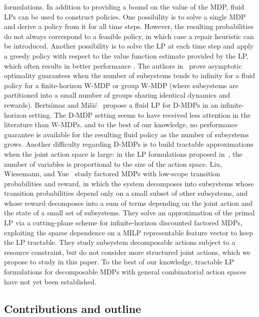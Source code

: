 \documentclass{article}
\begin{document}
formulations. In addition to providing a bound on the value of the MDP, fluid LPs can be used to construct policies. One possibility is to solve a single MDP and derive a policy from it for all time steps. However, the resulting probabilities do not always correspond to a feasible policy, in which case a repair heuristic \cite{DAeth2023HospitalScheduling} can be introduced. Another possibility is to solve the LP at each time step and apply a greedy policy with respect to the value function estimate provided by the LP, which often results in better performance \cite{gast2022lpupdate}. The authors in~\cite{brownzhang2022, DAeth2023HospitalScheduling} prove asymptotic optimality
guarantees when the number of subsystems tends to infinity for a fluid policy for a finite-horizon W-MDP or group W-MDP (where subsystems are partitioned into a small number of groups sharing identical dynamics and rewards). Bertsimas and Mišić~\cite{bertsimas2016}
propose a fluid LP for D-MDPs in an infinite-horizon setting. The D-MDP setting seems to have received
less attention in the literature than W-MDPs, and to the best of our knowledge, no
performance guarantee is available for the resulting fluid policy as the number of subsystems grows. Another difficulty regarding D-MDPs is to build tractable approximations when the joint action space is large: in the LP formulations proposed in~\cite{bertsimas2016}, the number of variables is proportional to the size of the action space. Liu,
Wiesemann, and Yue~\cite{liuwiesemannyue2024} study factored MDPs with low-scope transition
probabilities and reward, in which the system decomposes into subsystems whose transition probabilities
depend only on a small subset of other subsystems, and whose reward decomposes into a sum of terms
depending on the joint action and the state of a small set of subsystems. They solve an approximation of the primal LP via a cutting-plane scheme for infinite-horizon
discounted factored MDPs, exploiting the
sparse dependence on a MILP representable feature vector to keep the
LP tractable. They study subsystem decomposable actions subject to a resource constraint, but do not
consider more structured joint actions, which we propose to study in this paper. To the best of our
knowledge, tractable LP formulations for decomposable MDPs with general combinatorial action spaces have
not yet been established.

\subsection{Contributions and outline}
\end{document}
